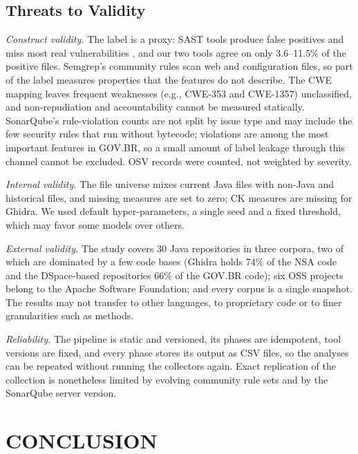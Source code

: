 \documentclass[a4paper,twoside]{article}
\begin{document}
\subsection{Threats to Validity}
\label{sec:threats}

\textit{Construct validity.} The label is a proxy: SAST tools produce false positives and miss most real vulnerabilities \cite{li2023}, and our two tools agree on only 3.6--11.5\% of the positive files. Semgrep's community rules scan web and configuration files, so part of the label measures properties that the features do not describe. The CWE mapping leaves frequent weaknesses (e.g., CWE-353 and CWE-1357) unclassified, and non-repudiation and accountability cannot be measured statically. SonarQube's rule-violation counts are not split by issue type and may include the few security rules that run without bytecode; violations are among the most important features in GOV.BR, so a small amount of label leakage through this channel cannot be excluded. OSV records were counted, not weighted by severity.

\textit{Internal validity.} The file universe mixes current Java files with non-Java and historical files, and missing measures are set to zero; CK measures are missing for Ghidra. We used default hyper-parameters, a single seed and a fixed threshold, which may favor some models over others.

\textit{External validity.} The study covers 30 Java repositories in three corpora, two of which are dominated by a few code bases (Ghidra holds 74\% of the NSA code and the DSpace-based repositories 66\% of the GOV.BR code); six OSS projects belong to the Apache Software Foundation; and every corpus is a single snapshot. The results may not transfer to other languages, to proprietary code or to finer granularities such as methods.

\textit{Reliability.} The pipeline is static and versioned, its phases are idempotent, tool versions are fixed, and every phase stores its output as CSV files, so the analyses can be repeated without running the collectors again. Exact replication of the collection is nonetheless limited by evolving community rule sets and by the SonarQube server version.

\section{\uppercase{Conclusion}}
\label{sec:conclusion}
\end{document}
